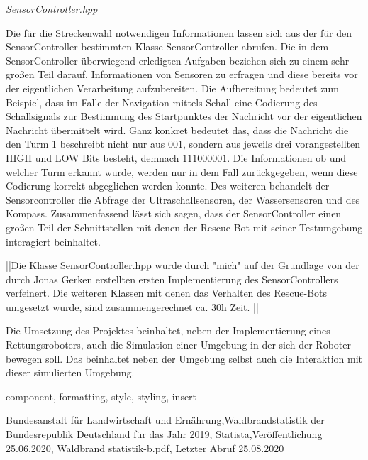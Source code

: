 \documentclass[conference]{IEEEtran}
\begin{document}
{\par
\textit{SensorController.hpp}
\par
Die für die Streckenwahl notwendigen Informationen lassen sich aus der für den SensorController bestimmten Klasse SensorController abrufen. Die in dem SensorController überwiegend erledigten Aufgaben beziehen sich zu einem sehr großen Teil darauf, Informationen von Sensoren zu erfragen und diese bereits vor der eigentlichen Verarbeitung aufzubereiten. Die Aufbereitung bedeutet zum Beispiel, dass im Falle der Navigation mittels Schall eine Codierung des Schallsignals zur Bestimmung des Startpunktes der Nachricht vor der eigentlichen Nachricht übermittelt wird. Ganz konkret bedeutet das, dass die Nachricht die den Turm 1 beschreibt nicht nur aus $001$, sondern aus jeweils drei vorangestellten HIGH und LOW Bits besteht, demnach $111000001$. Die Informationen ob und welcher Turm erkannt wurde, werden nur in dem Fall zurückgegeben, wenn diese Codierung korrekt abgeglichen werden konnte.
Des weiteren behandelt der Sensorcontroller die Abfrage der Ultraschallsensoren, der Wassersensoren und des Kompass. Zusammenfassend lässt sich sagen, dass der SensorController einen großen Teil der Schnittstellen mit denen der Rescue-Bot mit seiner Testumgebung interagiert beinhaltet. 
\par




||Die Klasse SensorController.hpp wurde durch "mich" auf der Grundlage von der durch Jonas Gerken erstellten ersten Implementierung des SensorControllers verfeinert. Die weiteren Klassen mit denen das Verhalten des Rescue-Bots umgesetzt wurde, sind zusammengerechnet ca. 30h Zeit. ||
\par 



 
Die Umsetzung des Projektes beinhaltet, neben der Implementierung eines Rettungsroboters, auch die Simulation einer Umgebung in der sich der Roboter bewegen soll. Das beinhaltet neben der Umgebung selbst auch die Interaktion mit dieser simulierten Umgebung.

}




\begin{IEEEkeywords}
component, formatting, style, styling, insert
\end{IEEEkeywords}
 Bundesanstalt für Landwirtschaft und Ernährung,Waldbrandstatistik der Bundesrepublik Deutschland für das Jahr 2019, Statista,Veröffentlichung 25.06.2020, Waldbrand statistik-b.pdf, Letzter Abruf 25.08.2020

\begin{thebibliography}{00}

\end{thebibliography}
\vspace{12pt}
\end{document}
